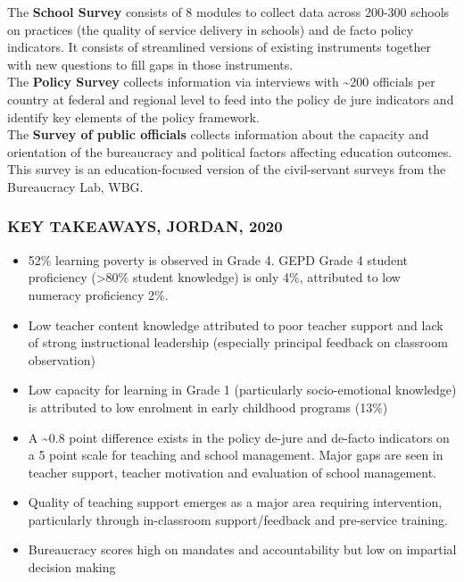 \documentclass[
  twocolumn]{article}
\providecommand{\tightlist}{%
  \setlength{\itemsep}{0pt}\setlength{\parskip}{0pt}}
\begin{document}
The \textbf{School Survey} consists of 8 modules to collect data across
200-300 schools on practices (the quality of service delivery in
schools) and de facto policy indicators. It consists of streamlined
versions of existing instruments together with new questions to fill
gaps in those instruments.\\
The \textbf{Policy Survey} collects information via interviews with
\textasciitilde200 officials per country at federal and regional level
to feed into the policy de jure indicators and identify key elements of
the policy framework.\\
The \textbf{Survey of public officials} collects information about the
capacity and orientation of the bureaucracy and political factors
affecting education outcomes. This survey is an education-focused
version of the civil-servant surveys from the Bureaucracy Lab, WBG.

\hypertarget{key-takeaways-2020}{%
\subsubsection{\texorpdfstring{\textbf{KEY TAKEAWAYS,
\uppercase{Jordan},
2020}}{KEY TAKEAWAYS, , 2020}}\label{key-takeaways-2020}}

\begin{itemize}
\tightlist
\item
  52\% learning poverty is observed in Grade 4. GEPD Grade 4 student
  proficiency (\textgreater80\% student knowledge) is only 4\%,
  attributed to low numeracy proficiency 2\%.
\item
  Low teacher content knowledge attributed to poor teacher support and
  lack of strong instructional leadership (especially principal feedback
  on classroom observation)
\item
  Low capacity for learning in Grade 1 (particularly socio-emotional
  knowledge) is attributed to low enrolment in early childhood programs
  (13\%)
\item
  A \textasciitilde0.8 point difference exists in the policy de-jure and
  de-facto indicators on a 5 point scale for teaching and school
  management. Major gaps are seen in teacher support, teacher motivation
  and evaluation of school management.
\item
  Quality of teaching support emerges as a major area requiring
  intervention, particularly through in-classroom support/feedback and
  pre-service training.
\item
  Bureaucracy scores high on mandates and accountability but low on
  impartial decision making
\end{itemize}
\end{document}
